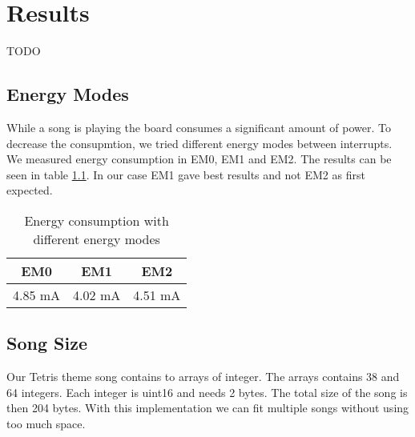 \chapter{Results}
TODO

\section{Energy Modes}
\label{sec:energyModeResults}
While a song is playing the board consumes a significant amount of power. To decrease the consupmtion, we tried different energy modes between interrupts. We measured energy consumption in EM0, EM1 and EM2. The results can be seen in table \ref{tab:benchmarkEnergyModes}. In our case EM1 gave best results and not EM2 as first expected.

\begin{table}[ht]
	\begin{center}
	\begin{tabular}{ |c|c|c| }
	  \hline
	  EM0 & EM1 & EM2 \\
	  \hline
	  4.85 mA & 4.02 mA & 4.51 mA \\
	  \hline

	\end{tabular}
	\caption{Energy consumption with different energy modes}
	\label{tab:benchmarkEnergyModes}
	\end{center}
\end{table}

\section{Song Size}
Our Tetris theme song contains to arrays of integer. The arrays contains 38 and 64 integers. Each integer is uint16 and needs 2 bytes. The total size of the song is then 204 bytes. With this implementation we can fit multiple songs without using too much space.